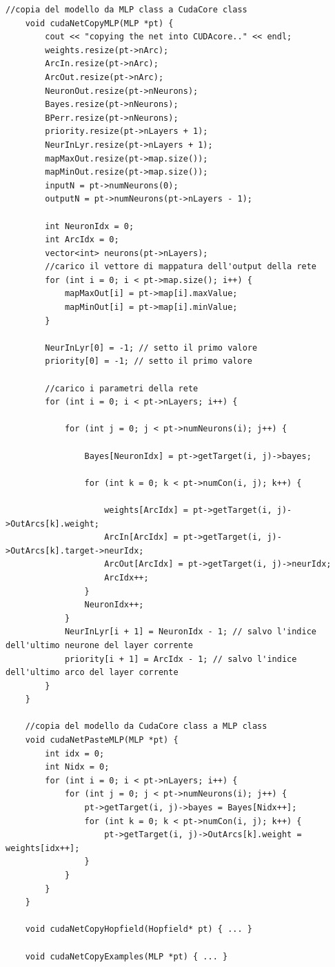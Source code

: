\documentclass[10pt,a4paper]{article}
\begin{document}
\begin{lstlisting}[style=mycuda, caption= classe di interfaccia alla GPU, captionpos=b]
	//copia del modello da MLP class a CudaCore class
	void cudaNetCopyMLP(MLP *pt) {
		cout << "copying the net into CUDAcore.." << endl;
		weights.resize(pt->nArc);
		ArcIn.resize(pt->nArc);
		ArcOut.resize(pt->nArc);
		NeuronOut.resize(pt->nNeurons);
		Bayes.resize(pt->nNeurons);
		BPerr.resize(pt->nNeurons);
		priority.resize(pt->nLayers + 1);
		NeurInLyr.resize(pt->nLayers + 1);
		mapMaxOut.resize(pt->map.size());
		mapMinOut.resize(pt->map.size());
		inputN = pt->numNeurons(0);
		outputN = pt->numNeurons(pt->nLayers - 1);

		int NeuronIdx = 0;
		int ArcIdx = 0;
		vector<int> neurons(pt->nLayers);
		//carico il vettore di mappatura dell'output della rete
		for (int i = 0; i < pt->map.size(); i++) {
			mapMaxOut[i] = pt->map[i].maxValue;
			mapMinOut[i] = pt->map[i].minValue;
		}

		NeurInLyr[0] = -1; // setto il primo valore 
		priority[0] = -1; // setto il primo valore 

		//carico i parametri della rete
		for (int i = 0; i < pt->nLayers; i++) {

			for (int j = 0; j < pt->numNeurons(i); j++) {

				Bayes[NeuronIdx] = pt->getTarget(i, j)->bayes;

				for (int k = 0; k < pt->numCon(i, j); k++) {

					weights[ArcIdx] = pt->getTarget(i, j)->OutArcs[k].weight;
					ArcIn[ArcIdx] = pt->getTarget(i, j)->OutArcs[k].target->neurIdx;
					ArcOut[ArcIdx] = pt->getTarget(i, j)->neurIdx;
					ArcIdx++;
				}
				NeuronIdx++;
			}
			NeurInLyr[i + 1] = NeuronIdx - 1; // salvo l'indice dell'ultimo neurone del layer corrente
			priority[i + 1] = ArcIdx - 1; // salvo l'indice dell'ultimo arco del layer corrente
		}
	}
	
	//copia del modello da CudaCore class a MLP class
	void cudaNetPasteMLP(MLP *pt) {
		int idx = 0;
		int Nidx = 0;
		for (int i = 0; i < pt->nLayers; i++) {
			for (int j = 0; j < pt->numNeurons(i); j++) {
				pt->getTarget(i, j)->bayes = Bayes[Nidx++];
				for (int k = 0; k < pt->numCon(i, j); k++) {
					pt->getTarget(i, j)->OutArcs[k].weight = weights[idx++];
				}
			}
		}
	}

	void cudaNetCopyHopfield(Hopfield* pt) { ... }

	void cudaNetCopyExamples(MLP *pt) { ... }
	
\end{lstlisting}
\end{document}
